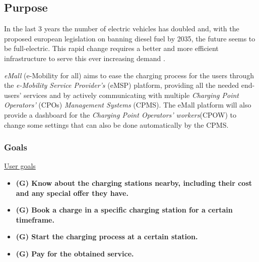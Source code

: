 \documentclass[table, 12pt]{article} %
\begin{document}
    \subsection{Purpose} %

         
        In the last 3 years the number of electric vehicles has doubled and, with the proposed european legislation on banning diesel fuel by 2035, the future seems to be full-electric. This rapid change requires a better and more efficient infrastructure to serve this ever increasing demand \cite{EV stock}. 
        

        \emph{eMall} (e-Mobility for all) aims to ease the charging process for the users through the \emph{e-Mobility Service Provider's} (eMSP) platform,
        providing all the needed end-users' services and by actively communicating with multiple \emph{Charging Point Operators'} (CPOs) \emph{Management Systems} (CPMS).
        The eMall platform will also provide a dashboard for the \emph{Charging Point Operators' workers}(CPOW) to change some settings that can also be done automatically by the CPMS.

    \subsubsection{Goals}
        \underline{User goals}
        \begin{itemize}
            \item  \textbf{(G) Know about the charging stations nearby, including their cost and any special offer they have.}
            \item  \textbf{(G) Book a charge in a specific charging station for a certain timeframe.}
            \item  \textbf{(G) Start the charging process at a certain station.}
            \item  \textbf{(G) Pay for the obtained service.}
        \end{itemize}
        
\end{document}
